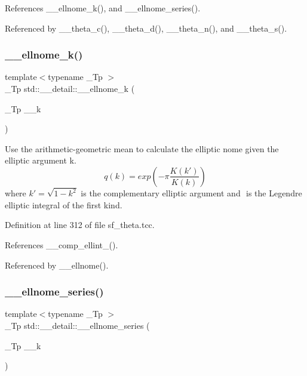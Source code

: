References \+\_\+\+\_\+ellnome\+\_\+k(), and \+\_\+\+\_\+ellnome\+\_\+series().



Referenced by \+\_\+\+\_\+theta\+\_\+c(), \+\_\+\+\_\+theta\+\_\+d(), \+\_\+\+\_\+theta\+\_\+n(), and \+\_\+\+\_\+theta\+\_\+s().

\mbox{\label{namespacestd_1_1____detail_a7631f367a1be34f98cec2021d588457b}} 
\subsubsection{\texorpdfstring{\+\_\+\+\_\+ellnome\+\_\+k()}{\_\_ellnome\_k()}}
{\footnotesize\ttfamily template$<$typename \+\_\+\+Tp $>$ \\
\+\_\+\+Tp std\+::\+\_\+\+\_\+detail\+::\+\_\+\+\_\+ellnome\+\_\+k (\begin{DoxyParamCaption}\item[{\+\_\+\+Tp}]{\+\_\+\+\_\+k }\end{DoxyParamCaption})}

Use the arithmetic-\/geometric mean to calculate the elliptic nome given the elliptic argument k. \[ q(k) = exp\left(-\pi\frac{K(k')}{K(k)}\right) \] where $ k' = \sqrt{1 - k^2} $ is the complementary elliptic argument and $ $ is the Legendre elliptic integral of the first kind. 

Definition at line 312 of file sf\+\_\+theta.\+tcc.



References \+\_\+\+\_\+comp\+\_\+ellint\+\_().



Referenced by \+\_\+\+\_\+ellnome().

\mbox{\label{namespacestd_1_1____detail_aec07b9131f90495831d349d22768425f}} 
\subsubsection{\texorpdfstring{\+\_\+\+\_\+ellnome\+\_\+series()}{\_\_ellnome\_series()}}
{\footnotesize\ttfamily template$<$typename \+\_\+\+Tp $>$ \\
\+\_\+\+Tp std\+::\+\_\+\+\_\+detail\+::\+\_\+\+\_\+ellnome\+\_\+series (\begin{DoxyParamCaption}\item[{\+\_\+\+Tp}]{\+\_\+\+\_\+k }\end{DoxyParamCaption})}

